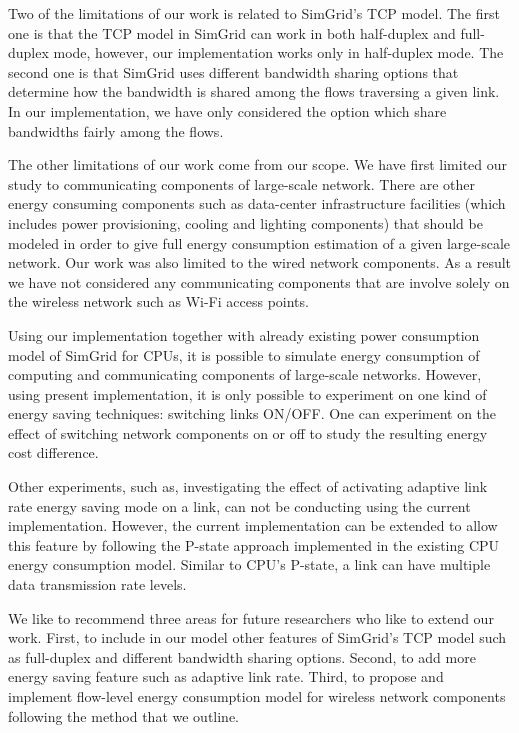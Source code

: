 Two of the limitations of our work is related to SimGrid's TCP model. The first one is that the TCP model in SimGrid can work in both half-duplex and full-duplex mode, however, our implementation works only in half-duplex mode. The second one  is that SimGrid uses different bandwidth sharing options that determine how the bandwidth is shared among the flows traversing a given link. In our implementation, we have only considered the option which share bandwidths fairly among the flows. 

The other limitations of our work come from our scope. We have first limited our study to communicating components of large-scale network. There are other energy consuming components such as data-center infrastructure facilities (which includes power provisioning, cooling and lighting components) that should be modeled in order to give full energy consumption estimation of a given large-scale network. Our work was also limited to the wired network components. As a result we have not considered any communicating components that are involve solely on the wireless network such as Wi-Fi access points. 

Using our implementation together with already existing power consumption model of SimGrid for CPUs, it is possible to simulate energy consumption of computing and communicating components of large-scale networks. However, using present implementation, it is only possible to experiment on one kind of energy saving techniques: switching links ON/OFF. One can experiment on the effect of switching network components on or off to study the resulting energy cost difference. 

Other experiments, such as, investigating the effect of activating adaptive link rate energy saving mode on a link, can not be conducting using the current implementation. However, the current implementation can be extended to allow this feature by following the P-state approach implemented in the existing CPU energy consumption model. Similar to CPU's P-state, a link can have multiple data transmission rate levels. 

We like to recommend three areas for future researchers who like to extend our work. First, to include in our model other features of SimGrid's TCP model such as full-duplex and different bandwidth sharing options.  Second, to add more energy saving feature such as adaptive link rate. Third, to propose and implement flow-level energy consumption model for wireless network components following the method that we outline. 
